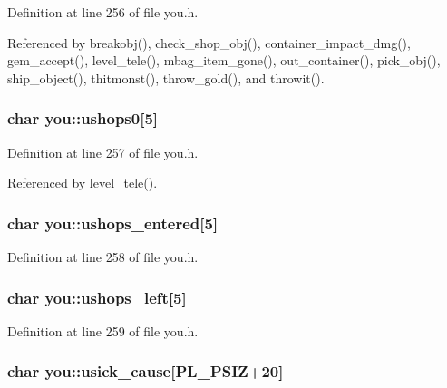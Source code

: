 Definition at line 256 of file you.\+h.



Referenced by breakobj(), check\+\_\+shop\+\_\+obj(), container\+\_\+impact\+\_\+dmg(), gem\+\_\+accept(), level\+\_\+tele(), mbag\+\_\+item\+\_\+gone(), out\+\_\+container(), pick\+\_\+obj(), ship\+\_\+object(), thitmonst(), throw\+\_\+gold(), and throwit().

\hypertarget{structyou_a566d23da377bbabdcc013adc0dbdbf41}{
\subsubsection[{ushops0}]{\setlength{\rightskip}{0pt plus 5cm}char you\+::ushops0\mbox{[}5\mbox{]}}}\label{structyou_a566d23da377bbabdcc013adc0dbdbf41}


Definition at line 257 of file you.\+h.



Referenced by level\+\_\+tele().

\hypertarget{structyou_a6bc37f3ed894820e70fb66f2c2998caf}{
\subsubsection[{ushops\+\_\+entered}]{\setlength{\rightskip}{0pt plus 5cm}char you\+::ushops\+\_\+entered\mbox{[}5\mbox{]}}}\label{structyou_a6bc37f3ed894820e70fb66f2c2998caf}


Definition at line 258 of file you.\+h.

\hypertarget{structyou_a3b24bf263b720623e3e2be14f25ce0fb}{
\subsubsection[{ushops\+\_\+left}]{\setlength{\rightskip}{0pt plus 5cm}char you\+::ushops\+\_\+left\mbox{[}5\mbox{]}}}\label{structyou_a3b24bf263b720623e3e2be14f25ce0fb}


Definition at line 259 of file you.\+h.

\hypertarget{structyou_a4a800dfd61b910ac10dc56ec67fe8452}{
\subsubsection[{usick\+\_\+cause}]{\setlength{\rightskip}{0pt plus 5cm}char you\+::usick\+\_\+cause\mbox{[}{\bf P\+L\+\_\+\+P\+S\+I\+Z}+20\mbox{]}}}\label{structyou_a4a800dfd61b910ac10dc56ec67fe8452}


